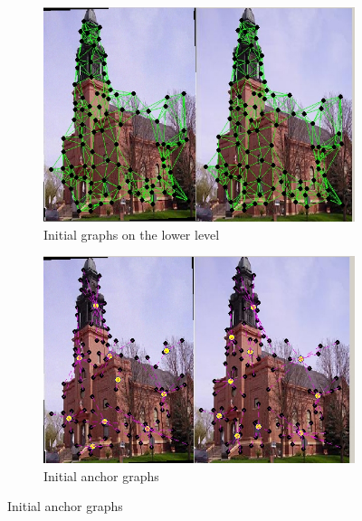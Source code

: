 \documentclass[
	fontsize=12pt,
	paper=a4,
	twoside=false,
	numbers=noenddot,
	plainheadsepline,
	toc=listof,
	toc=bibliography
]{scrartcl}
\begin{document}
\begin{figure}[ht] 
	\begin{subfigure}[b]{0.5\textwidth}
		\centering
		\includegraphics[scale=0.35]{fig/method2/test_imagetrafo1/initial_graphs.jpg} 
		\caption{Initial graphs on the lower level} 
	\end{subfigure}%
	\begin{subfigure}[b]{0.5\textwidth}
		\centering
		\includegraphics[scale=0.35]{fig/method2/test_imagetrafo1/initial_anchorgraphs.jpg} 
		\caption{Initial anchor graphs} 
	\end{subfigure} 


\end{figure}
\end{document}

